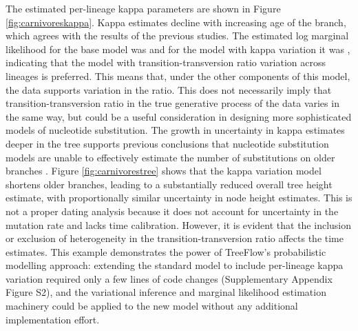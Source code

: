 The estimated per-lineage kappa parameters are shown in Figure \ref{fig:carnivoreskappa}. Kappa estimates decline with increasing age of the branch, which agrees with the results of the previous studies. The estimated log marginal likelihood for the base model was  and for the model with kappa variation it was , indicating that the model with transition-transversion ratio variation across lineages is preferred. This means that, under the other components of this model, the data supports variation in the ratio. This does not necessarily imply that transition-transversion ratio in the true generative process of the data varies in the same way, but could be a useful consideration in designing more sophisticated models of nucleotide substitution. The growth in uncertainty in kappa estimates deeper in the tree supports previous conclusions that nucleotide substitution models are unable to effectively estimate the number of substitutions on older branches \cite{duchene2015declining}. Figure \ref{fig:carnivorestree} shows that the kappa variation model shortens older branches, leading to a substantially reduced overall tree height estimate, with proportionally similar uncertainty in node height estimates. This is not a proper dating analysis because it does not account for uncertainty in the mutation rate and lacks time calibration. However, it is evident that the inclusion or exclusion of heterogeneity in the transition-transversion ratio affects the time estimates. This example demonstrates the power of TreeFlow's probabilistic modelling approach: extending the standard model to include per-lineage kappa variation required only a few lines of code changes (Supplementary Appendix Figure S2), and the variational inference and marginal likelihood estimation machinery could be applied to the new model without any additional implementation effort.

